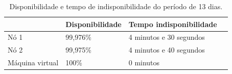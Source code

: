 \begin{table}[h!]
\caption{Disponibilidade e tempo de indisponibilidade do período de 13 dias.}
\label{tab:teste3disp}
\begin{center}
\begin{tabular}{|l|l|p{4cm}|l|}\hline
 & \textbf{Disponibilidade} & \textbf{Tempo indisponibilidade} \\\hline
Nó 1 & 99,976\% & 4 minutos e 30 segundos \\\hline
Nó 2 & 99,975\% & 4 minutos e 40 segundos \\\hline
Máquina virtual & 100\% & 0 minutos \\\hline
\end{tabular}
\end{center}
\end{table}


% 

